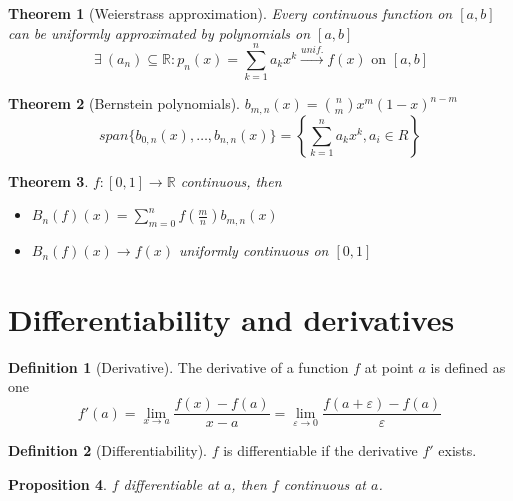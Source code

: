 \documentclass{article}
\newcommand{\DS}{\displaystyle}
\newcommand{\f}[3]{#1 : #2 \rightarrow #3}
\newcommand{\intcc}[1]{\left[#1\right]}
\newcommand{\lime}{\lim_{\varepsilon \to 0}}
\newcommand{\limx}[1]{\lim_{x \to #1}}
\newcommand{\tounif}{\xrightarrow{unif.}}
\theoremstyle{definition}
\newtheorem{definition}{Definition}[section]
\theoremstyle{definition}
\theoremstyle{plain}
\newtheorem{theorem}{Theorem}[section]
\theoremstyle{plain}
\theoremstyle{plain}
\theoremstyle{plain}
\newtheorem{proposition}[theorem]{Proposition}
\theoremstyle{definition}
\theoremstyle{remark}
\theoremstyle{remark}
\theoremstyle{remark}
\theoremstyle{remark}
\newcommand{\R}{\mathbb{R}}
\newcommand{\sumn}{\sum_{k=1}^n}
\newcommand{\Exists}{\ \exists \ }
\newcommand{\E}{\varepsilon}
\begin{document}
\begin{theorem}[Weierstrass approximation]
  Every continuous function on $\intcc{a,b}$ can be uniformly approximated by polynomials on $\intcc{a,b}$
  \[
  \Exists (a_n) \subseteq \R : p_n(x) = \sumn a_k x^k \tounif f(x) \text{ on } \intcc{a,b}
  \]
\end{theorem}


\begin{theorem}[Bernstein polynomials]
  $b_{m,n}(x) = \binom{n}{m} x^m (1-x)^{n-m}$
  \[
  span \{ b_{0,n}(x), \hdots, b_{n,n}(x) \} =
  \left\{ \sumn a_k x^k, a_i \in R \right\}
  \]
\end{theorem}



\begin{theorem}
  $\f{f}{\intcc{0,1}}{\R}$ continuous, then
  \begin{itemize}
  \item $\DS B_n(f)(x) = \sum_{m=0}^{n} f(\frac{m}{n}) b_{m,n}(x)$
  \item $B_n(f)(x) \to f(x)$ uniformly continuous on $\intcc{0,1}$
  \end{itemize}
\end{theorem}


\section{Differentiability and derivatives}


\begin{definition}[Derivative]
  The derivative of a function $f$ at point $a$ is defined as one
  \[
  f'(a) = \limx{a} \frac{f(x)-f(a)}{x-a} = \lime \frac{f(a+\E)-f(a)}{\E}
  \]
\end{definition}


\begin{definition}[Differentiability]
  $f$ is differentiable if the derivative $f'$ exists.
\end{definition}





\begin{proposition}
  $f$ differentiable at $a$, then $f$ continuous at $a$.
\end{proposition}
\end{document}
